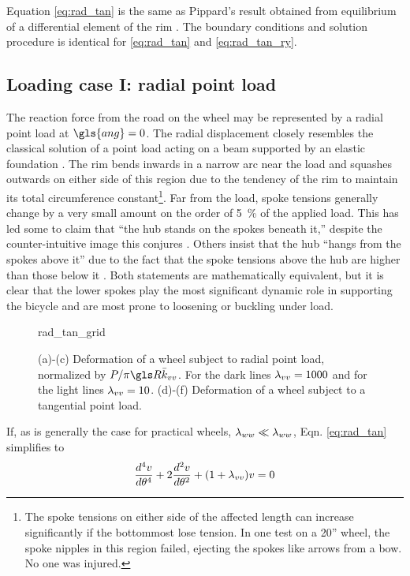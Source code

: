\documentclass[\rootdir/thesis.tex]{subfiles}
\begin{document}
Equation \eqref{eq:rad_tan} is the same as Pippard’s result obtained from equilibrium of a differential element of the rim \cite{Pippard1932b}. The boundary conditions and solution procedure is identical for \eqref{eq:rad_tan} and \eqref{eq:rad_tan_ry}.

\subsection{Loading case I: radial point load}

The reaction force from the road on the wheel may be represented by a radial point load at $\gls{ang}=0$. The radial displacement closely resembles the classical solution of a point load acting on a beam supported by an elastic foundation \cite{Hetenyi1946}. The rim bends inwards in a narrow arc near the load and squashes outwards on either side of this region due to the tendency of the rim to maintain its total circumference constant\footnote{The spoke tensions on either side of the affected length can increase significantly if the bottommost lose tension. In one test on a 20'' wheel, the spoke nipples in this region failed, ejecting the spokes like arrows from a bow. No one was injured.}. Far from the load, spoke tensions generally change by a very small amount on the order of \SI{5}{\percent} of the applied load. This has led some to claim that ``the hub stands on the spokes beneath it,'' despite the counter-intuitive image this conjures \cite{Brandt1993,Forester1980}. Others insist that the hub ``hangs from the spokes above it'' due to the fact that the spoke tensions above the hub are higher than those below it \cite{Fine1998}. Both statements are mathematically equivalent, but it is clear that the lower spokes play the most significant dynamic role in supporting the bicycle and are most prone to loosening or buckling under load.

\begin{figure}
\centering
{rad_tan_grid}
\caption[Radial-tangential deformation of the wheel]{(a)-(c) Deformation of a wheel subject to radial point load, normalized by $P/\pi\R\kvv$. For the dark lines $\lambda_{vv}=1000$ and for the light lines $\lambda_{vv}=10$. (d)-(f) Deformation of a wheel subject to a tangential point load.}
\label{fig:rad_tan_grid}
\end{figure}

If, as is generally the case for practical wheels, $\lambda_{ww} \ll \lambda_{ww}$, Eqn. \eqref{eq:rad_tan} simplifies to
\begin{equation}
\label{eq:rad}
\frac{d^4v}{d\theta^4} + 2\frac{d^2v}{d\theta^2} + (1+\lambda_{vv})v=0
\end{equation}
\end{document}
